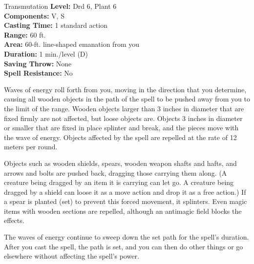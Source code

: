 {Transmutation}
{
	\textbf{Level:}
	Drd 6, Plant 6\\
	\textbf{Components:}
	V, S\\
	\textbf{Casting Time:}
	1 standard action\\
	\textbf{Range:}
	60 ft.\\
	\textbf{Area:}
	60-ft. line-shaped emanation from you\\
	\textbf{Duration:}
	1 min./level (D)\\
	\textbf{Saving Throw:}
	None\\
	\textbf{Spell Resistance:}
	No\\
}
{
	Waves of energy roll forth from you, moving in the direction that you determine, causing all wooden objects in the path of the spell to be pushed away from you to the limit of the range. Wooden objects larger than 3 inches in diameter that are fixed firmly are not affected, but loose objects are. Objects 3 inches in diameter or smaller that are fixed in place splinter and break, and the pieces move with the wave of energy. Objects affected by the spell are repelled at the rate of 12 meters per round.

	Objects such as wooden shields, spears, wooden weapon shafts and hafts, and arrows and bolts are pushed back, dragging those carrying them along. (A creature being dragged by an item it is carrying can let go. A creature being dragged by a shield can loose it as a move action and drop it as a free action.) If a spear is planted (set) to prevent this forced movement, it splinters. Even magic items with wooden sections are repelled, although an antimagic field blocks the effects.

	The waves of energy continue to sweep down the set path for the spell's duration. After you cast the spell, the path is set, and you can then do other things or go elsewhere without affecting the spell's power.

}
